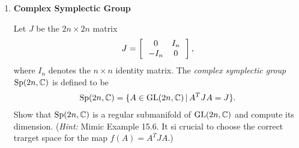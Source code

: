 \documentclass[12pt,a4paper]{report}
\begin{document}
\begin{enumerate}[label=\textbf{15.\arabic*.}]
	\item \textbf{Complex Symplectic Group}
	
	Let $J$ be the $2n\times 2n$ matrix
	\begin{align*}
		J=\left [\,  \begin{array}{c c} 0&I_n \\ -I_n & 0 \end{array}  \,\right ],
	\end{align*}where $I_n$ denotes the $n\times n$ identity matrix.  The \textit{complex symplectic group $\operatorname{Sp}(2n,\mathbb{C})$} is defined to be
	\begin{align*}
		\operatorname{Sp}(2n,\mathbb{C})=\{A \in \operatorname{GL}(2n,\mathbb{C})\,|\, A^TJA=J\}.
	\end{align*}Show that $\operatorname{Sp}(2n,\mathbb{C})$ is a regular submanifold of $\operatorname{GL}(2n,\mathbb{C})$ and compute its dimension.  (\textit{Hint:} Mimic Example 15.6.  It si crucial to choose the correct trarget space for the map $f(A)=A^TJA$.)
	
\end{enumerate}
\end{document}
